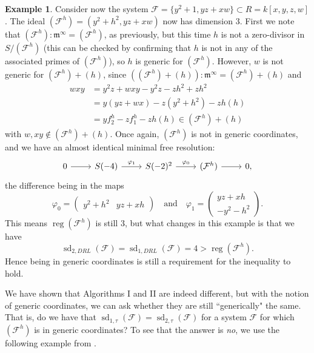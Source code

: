 \documentclass[11pt]{article}
\newcommand{\F}{\mathcal{F}}
\DeclareMathOperator{\sd}{sd}
\DeclareMathOperator{\reg}{reg}
\theoremstyle{definition}
\newtheorem{example}{Example}
\begin{document}
\begin{example}
	Consider now the system $\F = \{y^2 + 1, yz + xw\} \subset R = k[x,y,z,w]$. The ideal $(\F^h) = (y^2 + h^2, yz + xw)$ now has dimension 3. First we note that $(\F^h):\mathfrak{m}^\infty = (\F^h)$, as previously, but this time $h$ is not a zero-divisor in $S/(\F^h)$ (this can be checked by confirming that $h$ is not in any of the associated primes of $(\F^h)$), so $h$ is generic for $(\F^h)$. However, $w$ is not generic for $(\F^h) + (h)$, since $\left((\F^h) + (h)\right) : \mathfrak{m}^\infty = (\F^h) + (h)$ and \begin{align*}
		wxy &= y^2z + wxy - y^2z - zh^2 + zh^2 \\
		&= y(yz + wx) - z(y^2 + h^2) - zh(h) \\
		&= yf_2^h - zf_1^h - zh(h) \in (\F^h) + (h)
	\end{align*} with $w, xy \notin (\F^h) + (h)$. Once again, $(\F^h)$ is not in generic coordinates, and we have an almost identical minimal free resolution: \[ \begin{tikzcd}
		0 \arrow[r] & S(-4) \arrow[r, "\varphi_1"] & S(-2)^2 \arrow[r, "\varphi_0"] & (\F^h) \arrow[r] & 0,
	\end{tikzcd} \] the difference being in the maps \[ \varphi_0 = \begin{pmatrix}
		y^2 + h^2 & yz + xh 
	\end{pmatrix} \quad \text{and} \quad \varphi_1 = \begin{pmatrix}
		yz + xh \\
		-y^2 - h^2
	\end{pmatrix}. \] This means $\reg(\F^h)$ is still 3, but what changes in this example is that we have \[ \sd_{2,DRL}(\F) = \sd_{1,DRL}(\F) = 4 > \reg(\F^h). \] Hence being in generic coordinates is still a requirement for the inequality to hold. 
\end{example} 


We have shown that Algorithms I and II are indeed different, but with the notion of generic coordinates, we can ask whether they are still ``generically" the same. That is, do we have that $\sd_{1,\tau}(\F) = \sd_{2,\tau}(\F)$ for a system $\F$ for which $(\F^h)$ is in generic coordinates? To see that the answer is \emph{no}, we use the following example from \cite{minko2021security}.
\end{document}
